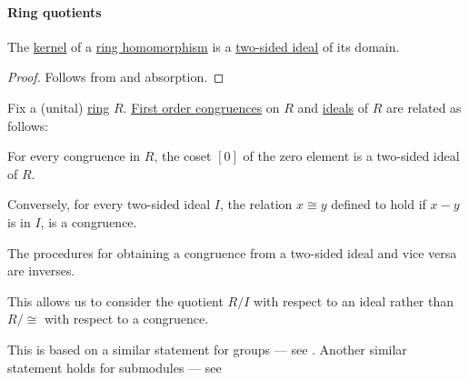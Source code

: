 \paragraph{Ring quotients}

\begin{proposition}\label{thm:kernel_is_ideal}
  The \hyperref[def:ring/kernel]{kernel} of a \hyperref[def:ring/homomorphism]{ring homomorphism} is a \hyperref[def:semiring_ideal]{two-sided ideal} of its domain.
\end{proposition}
\begin{proof}
  Follows from  and absorption.
\end{proof}

\begin{proposition}\label{thm:ideals_and_congruences}
  Fix a (unital) \hyperref[def:ring]{ring} \( R \). \hyperref[def:first_order_congruence]{First order congruences} on \( R \) and \hyperref[def:semiring_ideal]{ideals} of \( R \) are related as follows:
  \begin{thmenum}
     For every congruence in \( R \), the coset \( [0] \) of the zero element is a two-sided ideal of \( R \).

     Conversely, for every two-sided ideal \( I \), the relation \( x \cong y \) defined to hold if \( x - y \) is in \( I \), is a congruence.

     The procedures for obtaining a congruence from a two-sided ideal and vice versa are inverses.
  \end{thmenum}
\end{proposition}
\begin{comments}
  \item This allows us to consider the quotient \( R / I \) with respect to an ideal rather than \( R / {\cong} \) with respect to a congruence.

  \item This is based on a similar statement for groups --- see . Another similar statement holds for submodules --- see 
\end{comments}
